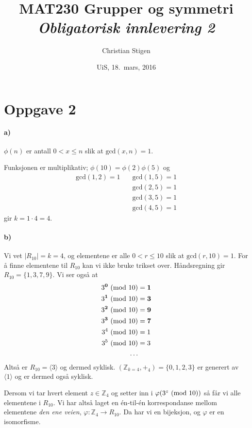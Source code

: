 \documentclass[a4paper,norsk,twocolumn,10pt]{article}
\title{MAT230 Grupper og symmetri\\ \textit{Obligatorisk innlevering 2}}
\author{Christian Stigen}
\date{UiS, 18.~mars, 2016}
\begin{document}
\maketitle

\section*{Oppgave 2}
\paragraph{\textbf{a)}}
$\phi{(n)}$ er antall $0 < x \leqslant n$ slik at $\text{gcd}{(x,n)} = 1$.

Funksjonen er multiplikativ; $\phi{(10)} = \phi{(2)} \phi{(5)}$ og
\begin{align*}
  \text{gcd}(1, 2) = 1 \quad & \text{gcd}(1, 5) = 1 \\
                       & \text{gcd}(2, 5) = 1 \\
                       & \text{gcd}(3, 5) = 1 \\
                       & \text{gcd}(4, 5) = 1
\end{align*}
gir $k = 1\cdot4 =4 $.

\paragraph{\textbf{b)}}
Vi vet $|R_{10}| = k = 4$, og elementene er alle $0 < r \leqslant 10$ slik
at $\text{gcd}(r, 10) = 1$. For å finne elementene til $R_{10}$ kan vi ikke
bruke trikset over. Håndsregning gir $R_{10} = \{ 1,3,7,9 \}$. Vi ser også at
\begin{align*}
  3^\textbf{0} \ (\text{mod}\ 10) &= \textbf{1} \\
  3^\textbf{1} \ (\text{mod}\ 10) &= \textbf{3} \\
  3^\textbf{2} \ (\text{mod}\ 10) &= \textbf{9} \\
  3^\textbf{3} \ (\text{mod}\ 10) &= \textbf{7} \\
  3^4 \ (\text{mod}\ 10) &= 1 \\
  3^5 \ (\text{mod}\ 10) &= 3 \\
  \ldots
\end{align*}
Altså er $R_{10} = \langle 3 \rangle$ og dermed syklisk.  $\left(
\mathbb{Z}_{k=4}, +_4 \right) = \{0,1,2,3\}$ er generert av $\langle 1 \rangle$
og er dermed også syklisk.

Dersom vi tar hvert element $z \in \mathbb{Z}_4$ og setter inn i
$\varphi{(3^z\ (\text{mod}\ 10))}$ så får vi alle elementene i $R_{10}$. Vi har altså
laget en én-til-én korrespondanse mellom elementene \textit{den ene veien},
$\varphi\colon \mathbb{Z}_4 \rightarrow R_{10}$. Da har vi en bijeksjon, og
$\varphi$ er en isomorfisme.
\end{document}
